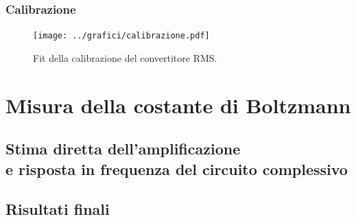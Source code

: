 \documentclass[a4paper,10pt]{article}
\begin{document}
\lipsum[2-5]

\subsubsection*{Calibrazione}

\lipsum[4]

\begin{figure}[H]
	\centering
	\texttt{[image: ../grafici/calibrazione.pdf]}
	\vspace*{10pt}
	\caption{Fit della calibrazione del convertitore RMS.}
	\label{fig:blocks}
\end{figure}

\section{Misura della costante di Boltzmann}

\subsection{Stima diretta dell'amplificazione \\e risposta in frequenza del circuito complessivo}

\lipsum[8]

\subsection{Risultati finali}

\lipsum[9]
\end{document}
